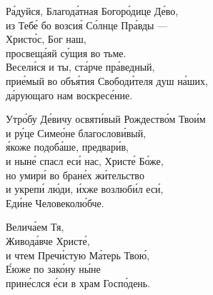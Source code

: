 \documentclass{article}
\begin{document}
%
Ра́дуйся, Благода́тная Богоро́дице Де́во, \\
из Тебе́ бо возсия́ Со́лнце Пра́вды --- \\
      \cont Христо́с, Бог наш, \\
просвеща́яй су́щия во тьме. \\
Весели́ся и ты, ста́рче пра́ведный,\\ 
прие́мый во объя́тия Свободи́теля душ на́ших,\\ 
да́рующаго нам воскресе́ние.

Утро́бу Де́вичу освяти́вый Рождество́м Твои́м \\
и ру́це Симео́не благослови́вый, \\
я́коже подоба́ше, предвари́в, \\
и ныне́ спасл еси́ нас, Христе́ Бо́же,\\ 
но умири́ во бране́х жи́тельство \\
и укрепи́ лю́ди, и́хже возлюби́л еси́, \\
    \cont Еди́не Человеколю́бче.

Велича́ем Тя, \\
Живода́вче Христе́, \\
и чтем  Пречи́стую Ма́терь Твою́, \\
Е́юже по зако́ну ны́не \\
прине́слся е́си в храм Госпо́день.
\end{document}
